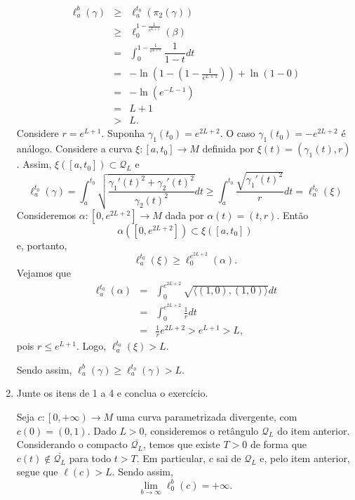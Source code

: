 \documentclass[twoside,openright,titlepage,numbers=noenddot,headinclude,  lineheaders footinclude=true,cleardoublepage=empty,BCOR=5mm,paper=a4,fontsize=12pt ]{scrbook}
\newcommand{\oo}{_}
\begin{document}
\begin{enumerate}
    \[
        \begin{array}{rcl}
            \ell \oo a ^b (\gamma ) 
            &\geq & \ell  \oo a ^{t \oo 0}(\pi\oo 2(\gamma))\\
            &\geq &\ell  \oo 0 ^{1-\frac{1}{e^{L+1}}} ( \beta ) \\
            &=&     \displaystyle\int \oo 0 ^{1-\frac{1}{e^{L+1}}} \dfrac{1}{1-t}dt \\
            &=& -\ln \left(1-\left({1-\frac{1}{e^{L+1}}}\right)\right) + \ln (1-0)\\
            &=&  -\ln (e^{-L-1})  \\
            &=&L+1\\
            &>& L.
        \end{array}
    \]
    Considere $r=e^{L+1}$. 
    Suponha $\gamma \oo 1 (t \oo 0)  = e^{2L+2}$.
    O caso $\gamma \oo 1 (t \oo 0)  = -e^{2L+2} $ é análogo.
    Considere a curva $ \xi :[a,t \oo 0]\rightarrow M$ definida por $\xi (t) = (\gamma \oo 1 (t), r)$.
    Assim, $\xi ([a,t \oo 0]) \subset \mathcal{Q}\oo L$ e 
    \[
        \ell \oo a ^{t \oo 0 } (\gamma) =\int_a^{t \oo 0} \sqrt{\frac{\gamma_1'(t)^2 + \gamma_2'(t)^2}{\gamma_2(t)^2}} dt
        \geq 
        \int_a^{t \oo 0} \frac{\sqrt{\gamma_1'(t)^2}}{r} dt
        = \ell \oo a^{t \oo 0} (\xi)
    \]
    Consideremos $\alpha : [0, e^{2L + 2}] \rightarrow M$ dada por $\alpha (t) = (t, r)$. 
    Então $$ \alpha ([0, e^{2L + 2}]) \subset \xi ([a, t_0]) $$ e, portanto, $$ \ell _a^{t \oo 0} (\xi) \geq \ell _0 ^{e ^{2L + 2}} (\alpha) .$$
    Vejamos que $$\begin{array}{ccl} 
    \ell _a ^{t \oo 0} (\alpha) & = & \displaystyle \int _0 ^{e^{2L + 2}} \sqrt{\langle (1, 0), (1, 0) \rangle} dt \\
    & = & \displaystyle \int _0 ^{e^{2L + 2}} \frac{1}{r} dt \\ 
    & = & \frac{1}{r} e^{2L + 2} > e^{L + 1} > L,
    \end{array}$$
    pois $r \leq e^{L + 1}$.
    Logo, $\ell _a^{t \oo 0} (\xi) > L$.
    
    Sendo assim, $\ell _a^b (\gamma) \geq \ell _a^{t_0} (\gamma) > L$.




\item Junte os itens de 1 a 4 e  conclua o exercício.

Seja $c : \left[ 0, +\infty \right ) \longrightarrow M$ uma curva parametrizada divergente, com $c (0) = (0, 1)$. 
Dado $L > 0$, consideremos o retângulo $\mathcal{Q}_L$ do item anterior.
Considerando o compacto $\overline{\mathcal{Q}_L}$, temos que existe $T > 0$ de forma que $c(t) \notin \overline{\mathcal{Q}_L}$ para todo $t > T$.
Em particular, $c$ sai de $\mathcal{Q}_L$ e, pelo item anterior, segue que $\ell (c) > L$.
Sendo assim, $$ \displaystyle \lim _{b \rightarrow \infty} \ell _0^b (c) = + \infty .$$
\end{enumerate}
\end{document}
